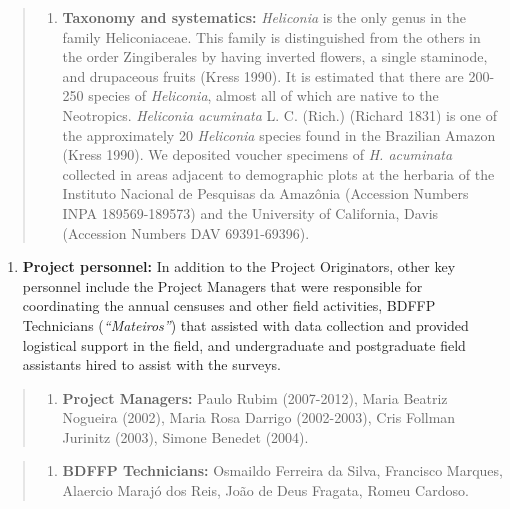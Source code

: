 \documentclass[
  man, donotrepeattitle,floatsintext]{apa6}
\providecommand{\tightlist}{%
  \setlength{\itemsep}{0pt}\setlength{\parskip}{0pt}}
\begin{document}
\begin{quote}
\begin{enumerate}
\def\labelenumi{\alph{enumi}.}
\setcounter{enumi}{1}
\tightlist
\item
  \textbf{Taxonomy and systematics:} \emph{Heliconia} is the only genus in the family Heliconiaceae. This family is distinguished from the others in the order Zingiberales by having inverted flowers, a single staminode, and drupaceous fruits (Kress 1990). It is estimated that there are 200-250 species of \emph{Heliconia}, almost all of which are native to the Neotropics. \emph{Heliconia acuminata} L. C. (Rich.) (Richard 1831) is one of the approximately 20 \emph{Heliconia} species found in the Brazilian Amazon (Kress 1990). We deposited voucher specimens of \emph{H. acuminata} collected in areas adjacent to demographic plots at the herbaria of the Instituto Nacional de Pesquisas da Amazônia (Accession Numbers INPA 189569-189573) and the University of California, Davis (Accession Numbers DAV 69391-69396).
\end{enumerate}
\end{quote}

\begin{enumerate}
\def\labelenumi{\arabic{enumi}.}
\setcounter{enumi}{3}
\tightlist
\item
  \textbf{Project personnel:} In addition to the Project Originators, other key personnel include the Project Managers that were responsible for coordinating the annual censuses and other field activities, BDFFP Technicians (\emph{``Mateiros''}) that assisted with data collection and provided logistical support in the field, and undergraduate and postgraduate field assistants hired to assist with the surveys.
\end{enumerate}

\begin{quote}
\begin{enumerate}
\def\labelenumi{\alph{enumi}.}
\tightlist
\item
  \textbf{Project Managers:} Paulo Rubim (2007-2012), Maria Beatriz Nogueira (2002), Maria Rosa Darrigo (2002-2003), Cris Follman Jurinitz (2003), Simone Benedet (2004).
\end{enumerate}
\end{quote}

\begin{quote}
\begin{enumerate}
\def\labelenumi{\alph{enumi}.}
\setcounter{enumi}{1}
\tightlist
\item
  \textbf{BDFFP Technicians:} Osmaildo Ferreira da Silva, Francisco Marques, Alaercio Marajó dos Reis, João de Deus Fragata, Romeu Cardoso.
\end{enumerate}
\end{quote}
\end{document}
